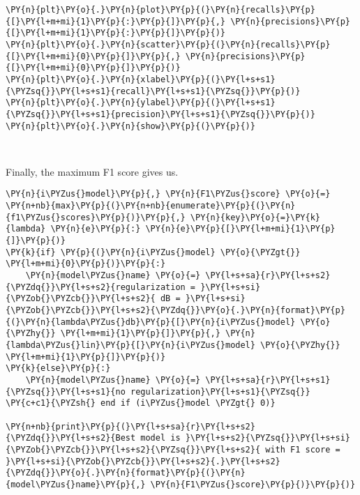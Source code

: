     \begin{tcolorbox}[breakable, size=fbox, boxrule=1pt, pad at break*=1mm,colback=cellbackground, colframe=cellborder]
\begin{Verbatim}[commandchars=\\\{\}]
\PY{n}{plt}\PY{o}{.}\PY{n}{plot}\PY{p}{(}\PY{n}{recalls}\PY{p}{[}\PY{l+m+mi}{1}\PY{p}{:}\PY{p}{]}\PY{p}{,} \PY{n}{precisions}\PY{p}{[}\PY{l+m+mi}{1}\PY{p}{:}\PY{p}{]}\PY{p}{)}
\PY{n}{plt}\PY{o}{.}\PY{n}{scatter}\PY{p}{(}\PY{n}{recalls}\PY{p}{[}\PY{l+m+mi}{0}\PY{p}{]}\PY{p}{,} \PY{n}{precisions}\PY{p}{[}\PY{l+m+mi}{0}\PY{p}{]}\PY{p}{)}
\PY{n}{plt}\PY{o}{.}\PY{n}{xlabel}\PY{p}{(}\PY{l+s+s1}{\PYZsq{}}\PY{l+s+s1}{recall}\PY{l+s+s1}{\PYZsq{}}\PY{p}{)}
\PY{n}{plt}\PY{o}{.}\PY{n}{ylabel}\PY{p}{(}\PY{l+s+s1}{\PYZsq{}}\PY{l+s+s1}{precision}\PY{l+s+s1}{\PYZsq{}}\PY{p}{)}
\PY{n}{plt}\PY{o}{.}\PY{n}{show}\PY{p}{(}\PY{p}{)}
\end{Verbatim}
\end{tcolorbox}

    \begin{center}
    \end{center}
    { \hspace*{\fill} \\}
    
    Finally, the maximum F1 score gives us.

    \begin{tcolorbox}[breakable, size=fbox, boxrule=1pt, pad at break*=1mm,colback=cellbackground, colframe=cellborder]
\begin{Verbatim}[commandchars=\\\{\}]
\PY{n}{i\PYZus{}model}\PY{p}{,} \PY{n}{F1\PYZus{}score} \PY{o}{=} \PY{n+nb}{max}\PY{p}{(}\PY{n+nb}{enumerate}\PY{p}{(}\PY{n}{f1\PYZus{}scores}\PY{p}{)}\PY{p}{,} \PY{n}{key}\PY{o}{=}\PY{k}{lambda} \PY{n}{e}\PY{p}{:} \PY{n}{e}\PY{p}{[}\PY{l+m+mi}{1}\PY{p}{]}\PY{p}{)}
\PY{k}{if} \PY{p}{(}\PY{n}{i\PYZus{}model} \PY{o}{\PYZgt{}} \PY{l+m+mi}{0}\PY{p}{)}\PY{p}{:}
    \PY{n}{model\PYZus{}name} \PY{o}{=} \PY{l+s+sa}{r}\PY{l+s+s2}{\PYZdq{}}\PY{l+s+s2}{regularization = }\PY{l+s+si}{\PYZob{}\PYZcb{}}\PY{l+s+s2}{ dB = }\PY{l+s+si}{\PYZob{}\PYZcb{}}\PY{l+s+s2}{\PYZdq{}}\PY{o}{.}\PY{n}{format}\PY{p}{(}\PY{n}{lambda\PYZus{}db}\PY{p}{[}\PY{n}{i\PYZus{}model} \PY{o}{\PYZhy{}} \PY{l+m+mi}{1}\PY{p}{]}\PY{p}{,} \PY{n}{lambda\PYZus{}lin}\PY{p}{[}\PY{n}{i\PYZus{}model} \PY{o}{\PYZhy{}} \PY{l+m+mi}{1}\PY{p}{]}\PY{p}{)}
\PY{k}{else}\PY{p}{:}
    \PY{n}{model\PYZus{}name} \PY{o}{=} \PY{l+s+sa}{r}\PY{l+s+s1}{\PYZsq{}}\PY{l+s+s1}{no regularization}\PY{l+s+s1}{\PYZsq{}}
\PY{c+c1}{\PYZsh{} end if (i\PYZus{}model \PYZgt{} 0)}

\PY{n+nb}{print}\PY{p}{(}\PY{l+s+sa}{r}\PY{l+s+s2}{\PYZdq{}}\PY{l+s+s2}{Best model is }\PY{l+s+s2}{\PYZsq{}}\PY{l+s+si}{\PYZob{}\PYZcb{}}\PY{l+s+s2}{\PYZsq{}}\PY{l+s+s2}{ with F1 score = }\PY{l+s+si}{\PYZob{}\PYZcb{}}\PY{l+s+s2}{.}\PY{l+s+s2}{\PYZdq{}}\PY{o}{.}\PY{n}{format}\PY{p}{(}\PY{n}{model\PYZus{}name}\PY{p}{,} \PY{n}{F1\PYZus{}score}\PY{p}{)}\PY{p}{)}
\end{Verbatim}
\end{tcolorbox}

